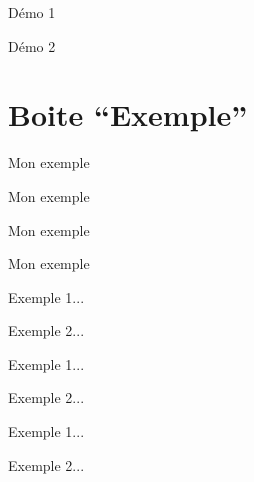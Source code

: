 \documentclass[a4paper,12pt]{article}
\begin{document}
\begin{demonstrations*}
	\item Démo 1
	\item Démo 2
\end{demonstrations*}%




	\section{Boite ``Exemple''}

\begin{code}%
\begin{exemple}
	Mon exemple
\end{exemple}
\end{code}

\begin{exemple}
	Mon exemple
\end{exemple}%

\begin{code}%
\begin{exemple*}
	Mon exemple
\end{exemple*}
\end{code}

\begin{exemple*}
	Mon exemple
\end{exemple*}%

\begin{code}%
\begin{exemples}
	\item Exemple 1...
	\item Exemple 2...
\end{exemples}
\end{code}

\begin{exemples}
	\item Exemple 1...
	\item Exemple 2...
\end{exemples}%

\begin{code}%
\begin{exemples*}
	\item Exemple 1...
	\item Exemple 2...
\end{exemples*}
\end{code}
\end{document}
